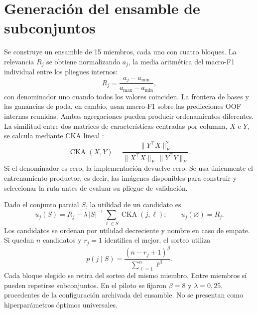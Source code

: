 \section{Generación del ensamble de subconjuntos}
Se construye un ensamble de 15 miembros, cada uno con cuatro bloques. La relevancia $R_j$ se obtiene normalizando $a_j$, la media aritmética del macro-F1 individual entre los pliegues internos:
\begin{equation}
R_j=\frac{a_j-a_{\min}}{a_{\max}-a_{\min}},
\label{eq:relevance}
\end{equation}
con denominador uno cuando todos los valores coinciden. La frontera de bases y las ganancias de poda, en cambio, usan macro-F1 sobre las predicciones OOF internas reunidas. Ambas agregaciones pueden producir ordenamientos diferentes. La similitud entre dos matrices de características centradas por columna, $X$ e $Y$, se calcula mediante CKA lineal \citep{kornblith2019similarity}:
\begin{equation}
\operatorname{CKA}(X,Y)=
\frac{\lVert Y^\top X\rVert_F^2}
{\lVert X^\top X\rVert_F\,\lVert Y^\top Y\rVert_F}.
\label{eq:cka}
\end{equation}
Si el denominador es cero, la implementación devuelve cero. Se usa únicamente el entrenamiento productor, es decir, las imágenes disponibles para construir y seleccionar la ruta antes de evaluar su pliegue de validación.

Dado el conjunto parcial $S$, la utilidad de un candidato es
\begin{equation}
u_j(S)=R_j-\lambda\,|S|^{-1}\sum_{\ell\in S}\operatorname{CKA}(j,\ell);
\qquad u_j(\varnothing)=R_j .
\label{eq:utility}
\end{equation}
Los candidatos se ordenan por utilidad decreciente y nombre en caso de empate. Si quedan $n$ candidatos y $r_j=1$ identifica el mejor, el sorteo utiliza
\begin{equation}
p(j\mid S)=\frac{(n-r_j+1)^\beta}{\sum_{\ell=1}^{n}\ell^\beta}.
\label{eq:lottery}
\end{equation}
Cada bloque elegido se retira del sorteo del mismo miembro. Entre miembros sí pueden repetirse subconjuntos. En el piloto se fijaron $\beta=8$ y $\lambda=0{,}25$, procedentes de la configuración archivada del ensamble. No se presentan como hiperparámetros óptimos universales.

